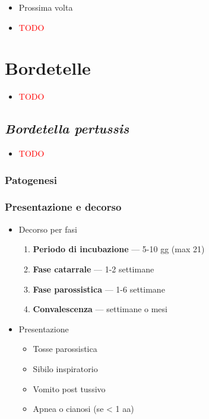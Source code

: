 \documentclass[italian,]{article}
\providecommand{\tightlist}{%
  \setlength{\itemsep}{0pt}\setlength{\parskip}{0pt}}
\newcommand{\TODO}[1]{\textcolor{red}{\textsf{\footnotesize{TODO #1}}}} %
\begin{document}
\begin{itemize}
\item
  Prossima volta
\item
  \TODO{}
\end{itemize}

\hypertarget{bordetelle}{%
\section{Bordetelle}\label{bordetelle}}

\begin{itemize}
\item
  \TODO{}
\end{itemize}

\hypertarget{bordetella-pertussis}{%
\subsection{\texorpdfstring{\emph{Bordetella
pertussis}}{Bordetella pertussis}}\label{bordetella-pertussis}}

\begin{itemize}
\item
  \TODO{}
\end{itemize}

\hypertarget{patogenesi-7}{%
\subsubsection{Patogenesi}\label{patogenesi-7}}

\hypertarget{presentazione-e-decorso}{%
\subsubsection{Presentazione e decorso}\label{presentazione-e-decorso}}

\begin{itemize}
\tightlist
\item
  Decorso per fasi

  \begin{enumerate}
  \def\labelenumi{\arabic{enumi}.}
  \setcounter{enumi}{-1}
  \tightlist
  \item
    \textbf{Periodo di incubazione} --- 5-10 gg (max 21)
  \item
    \textbf{Fase catarrale} --- 1-2 settimane
  \item
    \textbf{Fase parossistica} --- 1-6 settimane
  \item
    \textbf{Convalescenza} --- settimane o mesi
  \end{enumerate}
\item
  Presentazione

  \begin{itemize}
  \tightlist
  \item
    Tosse parossistica
  \item
    Sibilo inspiratorio
  \item
    Vomito post tussivo
  \item
    Apnea o cianosi (se \textless{} 1 aa)
  \end{itemize}
\end{itemize}
\end{document}
